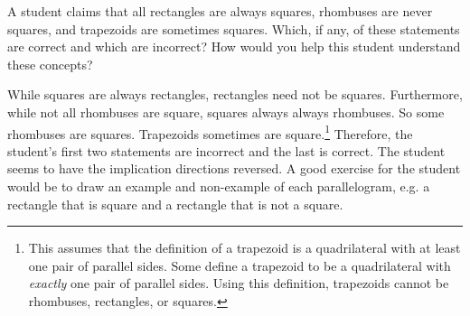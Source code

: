 \documentclass[11pt,letterpaper]{article}
\begin{document}
\newpage



 A student claims that all rectangles are always squares, rhombuses are never squares, and trapezoids are sometimes squares. Which, if any, of these statements are correct and which are incorrect? How would you help this student understand these concepts? \pspace

\sol While squares are always rectangles, rectangles need not be squares. Furthermore, while not all rhombuses are square, squares always always rhombuses. So some rhombuses are squares. Trapezoids sometimes are square.\footnote{This assumes that the definition of a trapezoid is a quadrilateral with at least one pair of parallel sides. Some define a trapezoid to be a quadrilateral with \textit{exactly} one pair of parallel sides. Using this definition, trapezoids cannot be rhombuses, rectangles, or squares.} Therefore, the student's first two statements are incorrect and the last is correct. The student seems to have the implication directions reversed. A good exercise for the student would be to draw an example and non-example of each parallelogram, e.g. a rectangle that is square and a rectangle that is not a square. 
\end{document}
